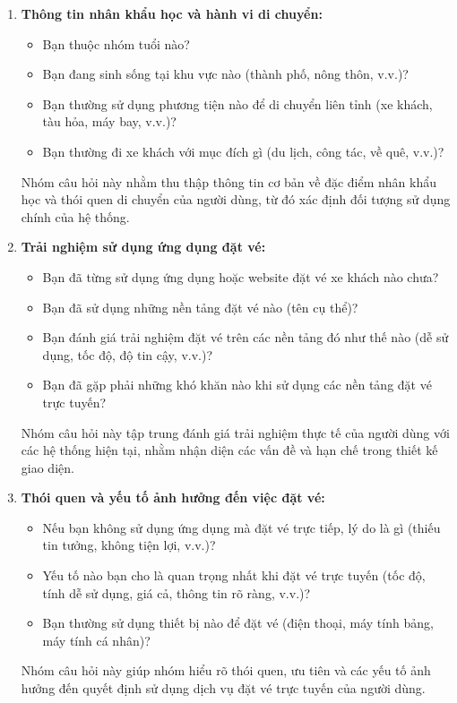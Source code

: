 \begin{enumerate}
    \item \textbf{Thông tin nhân khẩu học và hành vi di chuyển:}
    \begin{itemize}
        \item Bạn thuộc nhóm tuổi nào?
        \item Bạn đang sinh sống tại khu vực nào (thành phố, nông thôn, v.v.)?
        \item Bạn thường sử dụng phương tiện nào để di chuyển liên tỉnh (xe khách, tàu hỏa, máy bay, v.v.)?
        \item Bạn thường đi xe khách với mục đích gì (du lịch, công tác, về quê, v.v.)?
    \end{itemize}
    Nhóm câu hỏi này nhằm thu thập thông tin cơ bản về đặc điểm nhân khẩu học và thói quen di chuyển của người dùng, từ đó xác định đối tượng sử dụng chính của hệ thống.

    \item \textbf{Trải nghiệm sử dụng ứng dụng đặt vé:}
    \begin{itemize}
        \item Bạn đã từng sử dụng ứng dụng hoặc website đặt vé xe khách nào chưa?
        \item Bạn đã sử dụng những nền tảng đặt vé nào (tên cụ thể)?
        \item Bạn đánh giá trải nghiệm đặt vé trên các nền tảng đó như thế nào (dễ sử dụng, tốc độ, độ tin cậy, v.v.)?
        \item Bạn đã gặp phải những khó khăn nào khi sử dụng các nền tảng đặt vé trực tuyến?
    \end{itemize}
    Nhóm câu hỏi này tập trung đánh giá trải nghiệm thực tế của người dùng với các hệ thống hiện tại, nhằm nhận diện các vấn đề và hạn chế trong thiết kế giao diện.

    \item \textbf{Thói quen và yếu tố ảnh hưởng đến việc đặt vé:}
    \begin{itemize}
        \item Nếu bạn không sử dụng ứng dụng mà đặt vé trực tiếp, lý do là gì (thiếu tin tưởng, không tiện lợi, v.v.)?
        \item Yếu tố nào bạn cho là quan trọng nhất khi đặt vé trực tuyến (tốc độ, tính dễ sử dụng, giá cả, thông tin rõ ràng, v.v.)?
        \item Bạn thường sử dụng thiết bị nào để đặt vé (điện thoại, máy tính bảng, máy tính cá nhân)?
    \end{itemize}
    Nhóm câu hỏi này giúp nhóm hiểu rõ thói quen, ưu tiên và các yếu tố ảnh hưởng đến quyết định sử dụng dịch vụ đặt vé trực tuyến của người dùng.


\end{enumerate}
